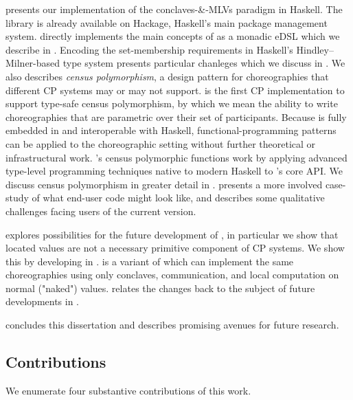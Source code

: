 presents our implementation of the conclaves-\&-MLVs paradigm in Haskell.
The \MultiChor library is already available on Hackage, Haskell's main package management system.
\MultiChor directly implements the main concepts of \HLSCentral as a monadic eDSL which we describe in .
Encoding the set-membership requirements in Haskell's Hindley–Milner-based type system presents particular chanleges
which we discuss in .
We also describes \emph{census polymorphism},
a design pattern for choreographies that different CP systems may or may not support.
\MultiChor is the first CP implementation to support type-safe census polymorphism,
by which we mean the ability to write choreographies
that are parametric over their set of participants.
Because \MultiChor is fully embedded in and interoperable with Haskell,
functional-programming patterns can be applied to the choreographic setting without further theoretical or infrastructural work.
\MultiChor's census polymorphic functions work by applying advanced type-level programming techniques native to modern Haskell
to \MultiChor's core API.
We discuss census polymorphism in greater detail in .
 presents a more involved case-study of what end-user \MultiChor code might look like,
and describes some qualitative challenges facing users of the current version.

 explores possibilities for the future development of \MultiChor,
in particular we show that located values are not a necessary primitive component of CP systems.
We show this
by developing \minichor in .
\minichor is a variant of \MultiChor
which can implement the same choreographies using only conclaves, communication, and local computation on normal ("naked") values.
 relates the changes back to the subject of future developments in \MultiChor.

 concludes this dissertation and describes promising avenues for future research.

\subsection{Contributions}
We enumerate four substantive contributions of this work.

